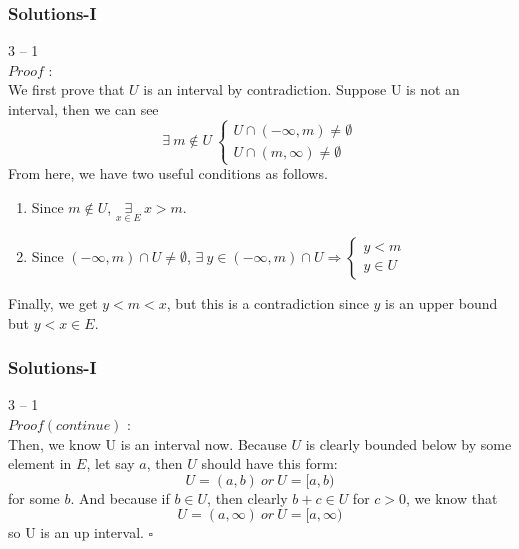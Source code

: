 \documentclass[12pt, t]{beamer}
\newcommand{\myqed}{\hfill$\square$}
\begin{document}
\begin{frame}
    \frametitle{Solutions-I}
    3 -- 1\\
    $Proof$ : \\
    \hspace{1em} We first prove that $U$ is an interval by contradiction. Suppose U is not an interval, then we can see
    \begin{equation*}
        \exists\ m\notin U\
        \begin{cases}
            U\cap(-\infty, m)\neq \emptyset \\
            U\cap(m,\infty)\neq \emptyset
        \end{cases}
    \end{equation*}
    \hspace{1em} From here, we have two useful conditions as follows.
    \begin{enumerate}
        \item Since $m\notin U$, $\underset{x\in E}{\exists}\ x>m $.
        \item Since $(-\infty,m)\cap U\neq \emptyset$, $\exists\ y\in (-\infty,m)\cap U\Rightarrow
                  \begin{cases}
                      y<m \\
                      y\in U
                  \end{cases}$
    \end{enumerate}
    \hspace{1em} Finally, we get $y<m<x$, but this is a contradiction since $y$ is an upper bound but $y<x\in E$.
\end{frame}

\begin{frame}
    \frametitle{Solutions-I}
    3 -- 1\\
    $Proof(continue)$ : \\
    \hspace{1em} Then, we know U is an interval now. Because $U$ is clearly bounded below by some element in $E$, let say $a$, then
    $U$ should have this form:
    \begin{equation*}
        U=(a,b)\ or\ U=[a,b)
    \end{equation*}
    for some $b$. And because if $b\in U$, then clearly $b+c\in U$ for $c>0$, we know that
    \begin{equation*}
        U=(a,\infty)\ or\ U=[a,\infty)
    \end{equation*}
    so U is an up interval.
    \myqed
\end{frame}
\end{document}

